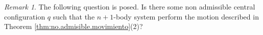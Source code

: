 \documentclass[twoside]{article}
\theoremstyle{remark}
\newtheorem{comentario}{Remark}
\begin{document}
\begin{comentario}
 The following question is posed. Is there some non admissible central configuration $q$ such that the $n+1$-body system perform the motion described in Theorem \ref{thm:no.admisible.movimiento}(2)?
\end{comentario}





 
\end{document}

